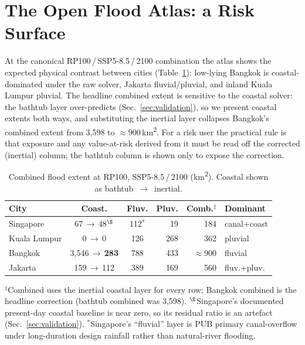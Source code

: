\documentclass[11pt,a4paper]{article}
\begin{document}
\section{The Open Flood Atlas: a Risk Surface}
At the canonical RP100\,/\,SSP5-8.5\,/\,2100 combination the atlas shows the expected physical contrast between cities (Table~\ref{tab:extent}): low-lying Bangkok is coastal-dominated under the raw solver, Jakarta fluvial/pluvial, and inland Kuala Lumpur pluvial. The headline combined extent is sensitive to the coastal solver: the bathtub layer over-predicts (Sec.~\ref{sec:validation}), so we present coastal extents both ways, and substituting the inertial layer collapses Bangkok's combined extent from 3{,}598 to ${\approx}900$\,km\textsuperscript{2}. For a risk user the practical rule is that exposure and any value-at-risk derived from it must be read off the corrected (inertial) column; the bathtub column is shown only to expose the correction.

\begin{table}[t]
\centering
\caption{Combined flood extent at RP100, SSP5-8.5\,/\,2100 (km\textsuperscript{2}). Coastal shown as bathtub~$\rightarrow$~inertial.}
\label{tab:extent}
\small
\begin{tabular}{@{}lccrrl@{}}
\toprule
City         & Coast.                                    & Fluv.                  & Pluv. & Comb.$^{\ddag}$ & Dominant \\
\midrule
Singapore    & 67\,$\rightarrow$\,48$^{\S}$               & 112$^{*}$              & 19    & 184             & canal+coast \\
Kuala Lumpur & 0\,$\rightarrow$\,0                        & 126                    & 268   & 362             & pluvial \\
Bangkok      & 3{,}546\,$\rightarrow$\,\textbf{283}       & 788                    & 433   & ${\approx}$900  & fluvial \\
Jakarta      & 159\,$\rightarrow$\,112                    & 389                    & 169   & 560             & fluv.+pluv. \\
\bottomrule
\end{tabular}

\vspace{3pt}
{\footnotesize $^{\ddag}$Combined uses the inertial coastal layer for every row; Bangkok combined is the headline correction (bathtub combined was 3{,}598). $^{\S}$Singapore's documented present-day coastal baseline is near zero, so its residual ratio is an artefact (Sec.~\ref{sec:validation}). $^{*}$Singapore's ``fluvial'' layer is PUB primary canal-overflow under long-duration design rainfall rather than natural-river flooding.}
\end{table}
\end{document}
